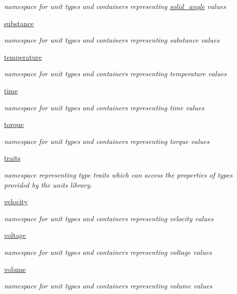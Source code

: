 \begin{DoxyCompactItemize}
\begin{DoxyCompactList}\small\item\em namespace for unit types and containers representing \hyperlink{namespaceunits_1_1solid__angle}{solid\+\_\+angle} values \end{DoxyCompactList}\item 
 \hyperlink{namespaceunits_1_1substance}{substance}
\begin{DoxyCompactList}\small\item\em namespace for unit types and containers representing substance values \end{DoxyCompactList}\item 
 \hyperlink{namespaceunits_1_1temperature}{temperature}
\begin{DoxyCompactList}\small\item\em namespace for unit types and containers representing temperature values \end{DoxyCompactList}\item 
 \hyperlink{namespaceunits_1_1time}{time}
\begin{DoxyCompactList}\small\item\em namespace for unit types and containers representing time values \end{DoxyCompactList}\item 
 \hyperlink{namespaceunits_1_1torque}{torque}
\begin{DoxyCompactList}\small\item\em namespace for unit types and containers representing torque values \end{DoxyCompactList}\item 
 \hyperlink{namespaceunits_1_1traits}{traits}
\begin{DoxyCompactList}\small\item\em namespace representing type traits which can access the properties of types provided by the units library. \end{DoxyCompactList}\item 
 \hyperlink{namespaceunits_1_1velocity}{velocity}
\begin{DoxyCompactList}\small\item\em namespace for unit types and containers representing velocity values \end{DoxyCompactList}\item 
 \hyperlink{namespaceunits_1_1voltage}{voltage}
\begin{DoxyCompactList}\small\item\em namespace for unit types and containers representing voltage values \end{DoxyCompactList}\item 
 \hyperlink{namespaceunits_1_1volume}{volume}
\begin{DoxyCompactList}\small\item\em namespace for unit types and containers representing volume values \end{DoxyCompactList}\end{DoxyCompactItemize}
